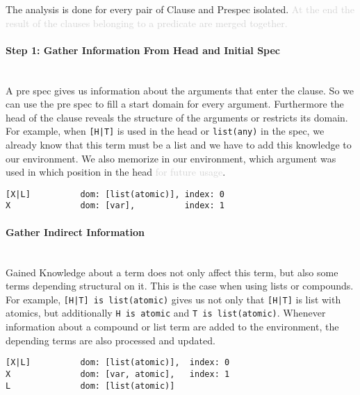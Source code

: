\documentclass[a4paper]{article}
\newcommand{\future}[1]{\textcolor{lightgray}{#1}}
\begin{document}
The analysis is done for every pair of Clause and Prespec isolated. \future{At
  the end the result of the clauses belonging to a predicate are merged together.}



\paragraph{Step 1: Gather Information From Head and Initial Spec}\hfill\\
A pre spec gives us information about the arguments that enter the clause. So we
can use the pre spec to fill a start domain for every argument. Furthermore the
head of the clause reveals the structure of the arguments or restricts its
domain. For example, when \texttt{[H|T]} is used in the head or
\texttt{list(any)} in the spec, we already know
that this term must be a list and we have to add this knowledge to our
environment.
We also memorize in our environment, which argument was used in which position
in the head \future{for future usage}.

\begin{lstlisting}
[X|L]          dom: [list(atomic)], index: 0
X              dom: [var],          index: 1

\end{lstlisting}

\paragraph{Gather Indirect Information}\hfill\\
Gained Knowledge about a term does not only affect this term, but also some
terms depending structural on it. This is the case when using lists or
compounds.
For example, \texttt{[H|T] is list(atomic)} gives us not only that \texttt{[H|T]} is list
with atomics, but additionally \texttt{H is atomic} and \texttt{T is
  list(atomic)}.
Whenever information about a compound or list term are added to the environment,
the depending terms are also processed and updated.

\begin{lstlisting}
[X|L]          dom: [list(atomic)],  index: 0
X              dom: [var, atomic],   index: 1
L              dom: [list(atomic)]
\end{lstlisting}
\end{document}
